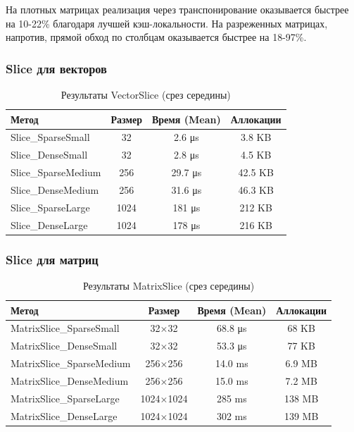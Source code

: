 \documentclass[a4paper]{article}
\begin{document}
На плотных матрицах реализация через транспонирование оказывается быстрее на 10-22\% благодаря лучшей кэш-локальности. На разреженных матрицах, напротив, прямой обход по столбцам оказывается быстрее на 18-97\%.

\subsubsection{Slice для векторов}

\begin{table}[H]
\centering
\caption{Результаты VectorSlice (срез середины)}
\begin{tabular}{lccc}
\toprule
Метод & Размер & Время (Mean) & Аллокации \\
\midrule
Slice\_SparseSmall & 32 & 2.6 μs & 3.8 KB \\
Slice\_DenseSmall & 32 & 2.8 μs & 4.5 KB \\
Slice\_SparseMedium & 256 & 29.7 μs & 42.5 KB \\
Slice\_DenseMedium & 256 & 31.6 μs & 46.3 KB \\
Slice\_SparseLarge & 1024 & 181 μs & 212 KB \\
Slice\_DenseLarge & 1024 & 178 μs & 216 KB \\
\bottomrule
\end{tabular}
\end{table}

\subsubsection{Slice для матриц}

\begin{table}[H]
\centering
\caption{Результаты MatrixSlice (срез середины)}
\begin{tabular}{lccc}
\toprule
Метод & Размер & Время (Mean) & Аллокации \\
\midrule
MatrixSlice\_SparseSmall & 32×32 & 68.8 μs & 68 KB \\
MatrixSlice\_DenseSmall & 32×32 & 53.3 μs & 77 KB \\
MatrixSlice\_SparseMedium & 256×256 & 14.0 ms & 6.9 MB \\
MatrixSlice\_DenseMedium & 256×256 & 15.0 ms & 7.2 MB \\
MatrixSlice\_SparseLarge & 1024×1024 & 285 ms & 138 MB \\
MatrixSlice\_DenseLarge & 1024×1024 & 302 ms & 139 MB \\
\bottomrule
\end{tabular}
\end{table}
\end{document}
